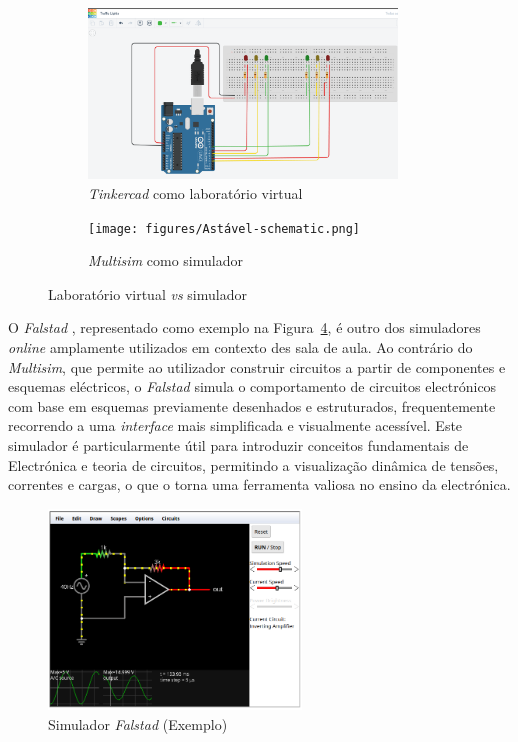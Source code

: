\begin{figure}[hbtp]
    \centering
    \begin{subfigure}[hbtp]{0.48\textwidth}
        \centering
        \includegraphics[width=0.9\textwidth]{figures/tinkercad_exemplo.png}
        \caption{\textit{Tinkercad} como laboratório virtual \cite{tinkercad}}
        \label{fig:tinkercadVL}
    \end{subfigure}
    \begin{subfigure}[hbtp]{0.48\textwidth}
        \texttt{[image: figures/Astável-schematic.png]}
        \caption{\textit{Multisim} como simulador \cite{multisim}}
        \label{fig:multisimSimulador}
    \end{subfigure}
    \caption{Laboratório virtual \textit{vs} simulador}
    \label{fig:tinkercad}
\end{figure}

O \textit{Falstad} \cite{falstad}, representado como exemplo na Figura~\ref{fig:falstad}, é outro dos simuladores \textit{online} amplamente utilizados em contexto des sala de aula. Ao contrário do \textit{Multisim}, que permite ao utilizador construir circuitos a partir de componentes e esquemas eléctricos, o \textit{Falstad} simula o comportamento de circuitos electrónicos com base em esquemas previamente desenhados e estruturados, frequentemente recorrendo a uma \textit{interface} mais simplificada e visualmente acessível. Este simulador é particularmente útil para introduzir conceitos fundamentais de Electrónica e teoria de circuitos, permitindo a visualização dinâmica de tensões, correntes e cargas, o que o torna uma ferramenta valiosa no ensino da electrónica.

\begin{figure}[hbtp]
    \centering
    \includegraphics[width=0.6\textwidth]{figures/falstad.png}
    \caption{Simulador \textit{Falstad} (Exemplo) \cite{falstad}}
    \label{fig:falstad}
\end{figure}

